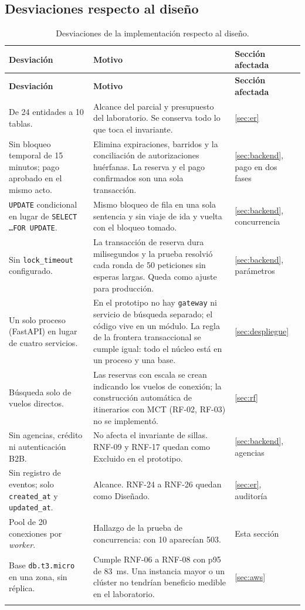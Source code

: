 \documentclass[10pt,letterpaper]{article}
\begin{document}
\subsection{Desviaciones respecto al diseño}
\begin{longtable}{@{}L{4.6cm} L{6.6cm} L{4.4cm}@{}}
\toprule \textbf{Desviación} & \textbf{Motivo} & \textbf{Sección afectada} \\ \midrule \endfirsthead
\toprule \textbf{Desviación} & \textbf{Motivo} & \textbf{Sección afectada} \\ \midrule \endhead
De 24 entidades a 10 tablas. & Alcance del parcial y presupuesto del laboratorio. Se conserva todo lo que toca el invariante. & \ref{sec:er} \\
Sin bloqueo temporal de 15 minutos; pago aprobado en el mismo acto. & Elimina expiraciones, barridos y la conciliación de autorizaciones huérfanas. La reserva y el pago confirmados son una sola transacción. & \ref{sec:backend}, pago en dos fases \\
\texttt{UPDATE} condicional en lugar de \texttt{SELECT \ldots FOR UPDATE}. & Mismo bloqueo de fila en una sola sentencia y sin viaje de ida y vuelta con el bloqueo tomado. & \ref{sec:backend}, concurrencia \\
Sin \texttt{lock\_timeout} configurado. & La transacción de reserva dura milisegundos y la prueba resolvió cada ronda de 50 peticiones sin esperas largas. Queda como ajuste para producción. & \ref{sec:backend}, parámetros \\
Un solo proceso (FastAPI) en lugar de cuatro servicios. & En el prototipo no hay \texttt{gateway} ni servicio de búsqueda separado; el código vive en un módulo. La regla de la frontera transaccional se cumple igual: todo el núcleo está en un proceso y una base. & \ref{sec:despliegue} \\
Búsqueda solo de vuelos directos. & Las reservas con escala se crean indicando los vuelos de conexión; la construcción automática de itinerarios con MCT (RF-02, RF-03) no se implementó. & \ref{sec:rf} \\
Sin agencias, crédito ni autenticación B2B. & No afecta el invariante de sillas. RNF-09 y RNF-17 quedan como Excluido en el prototipo. & \ref{sec:backend}, agencias \\
Sin registro de eventos; solo \texttt{created\_at} y \texttt{updated\_at}. & Alcance. RNF-24 a RNF-26 quedan como Diseñado. & \ref{sec:er}, auditoría \\
Pool de 20 conexiones por \emph{worker}. & Hallazgo de la prueba de concurrencia: con 10 aparecían 503. & Esta sección \\
Base \texttt{db.t3.micro} en una zona, sin réplica. & Cumple RNF-06 a RNF-08 con p95 de 83~ms. Una instancia mayor o un clúster no tendrían beneficio medible en el laboratorio. & \ref{sec:aws} \\
\bottomrule
\caption{Desviaciones de la implementación respecto al diseño.}
\end{longtable}
\end{document}
